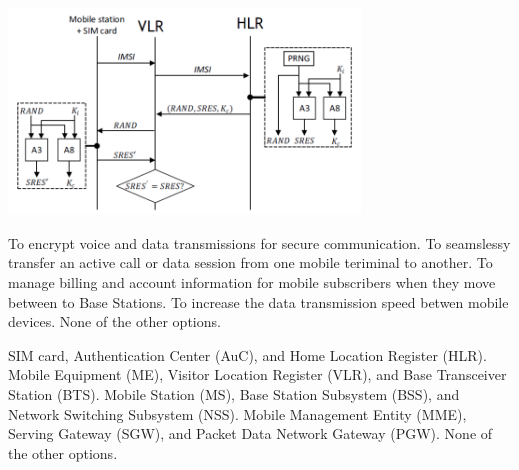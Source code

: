 \begin{questions}
    \begin{solution}
        \center
        \includegraphics[width=0.7\textwidth]{images/GSM_auth.png}
    \end{solution}






    \begin{checkboxes}
        \choice To encrypt voice and data transmissions for secure communication.
        \choice To seamslessy transfer an active call or data session from one mobile teriminal to another.
        \choice To manage billing and account information for mobile subscribers when they move between to Base Stations.
        \choice To increase the data transmission speed betwen mobile devices.
        \CorrectChoice None of the other options.
    \end{checkboxes}

    \begin{checkboxes}
        \CorrectChoice SIM card, Authentication Center (AuC), and Home Location Register (HLR).
        \choice Mobile Equipment (ME), Visitor Location Register (VLR), and Base Transceiver Station (BTS).
        \choice Mobile Station (MS), Base Station Subsystem (BSS), and Network Switching Subsystem (NSS).
        \choice Mobile Management Entity (MME), Serving Gateway (SGW), and Packet Data Network Gateway (PGW).
        \choice None of the other options.
    \end{checkboxes}


\end{questions}
